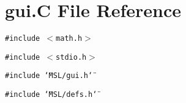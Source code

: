 \section{gui.C File Reference}
\label{gui_8C}
{\tt \#include $<$math.h$>$}\par
{\tt \#include $<$stdio.h$>$}\par
{\tt \#include \char`\"{}MSL/gui.h\char`\"{}}\par
{\tt \#include \char`\"{}MSL/defs.h\char`\"{}}\par
